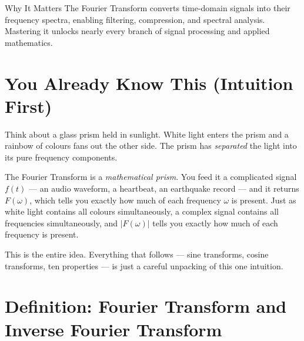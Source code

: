 \documentclass[12pt,a4paper]{article}
\begin{document}
\vspace{0.8em}
\begin{learnbox}{Why It Matters}
The Fourier Transform converts time-domain signals into their frequency spectra, enabling filtering,
compression, and spectral analysis.
Mastering it unlocks nearly every branch of signal processing and applied mathematics.
\end{learnbox}

\section{You Already Know This (Intuition First)}

Think about a glass prism held in sunlight.
White light enters the prism and a rainbow of colours fans out the other side.
The prism has \emph{separated} the light into its pure frequency components.

The Fourier Transform is a \emph{mathematical prism}.
You feed it a complicated signal $f(t)$ --- an audio waveform, a heartbeat, an earthquake record ---
and it returns $F(\omega)$, which tells you exactly how much of each frequency $\omega$ is present.
Just as white light contains all colours simultaneously, a complex signal contains all frequencies
simultaneously, and $|F(\omega)|$ tells you exactly how much of each frequency is present.

This is the entire idea.
Everything that follows --- sine transforms, cosine transforms, ten properties --- is just a careful
unpacking of this one intuition.

\section{Definition: Fourier Transform and Inverse Fourier Transform}
\end{document}
